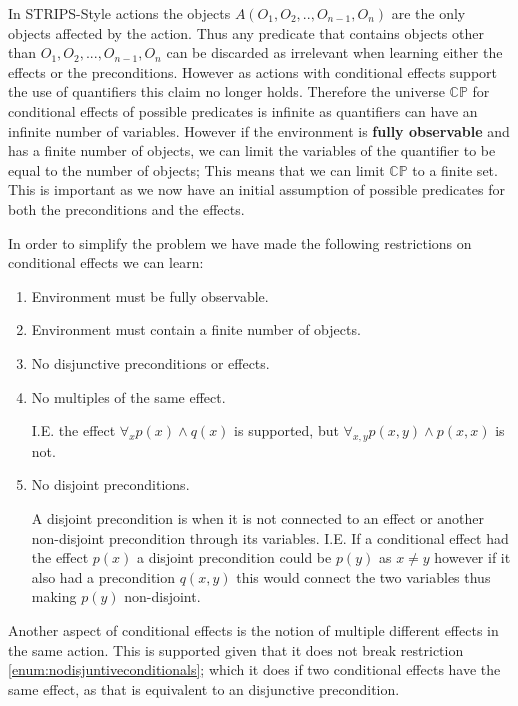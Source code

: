 \documentclass[../Master.tex]{subfiles}
\begin{document}
In STRIPS-Style actions the objects $A(O_1,O_2,..,O_{n-1},O_n)$ are the only objects affected by the action. 
Thus any predicate that contains objects other than $O_1,O_2,...,O_{n-1},O_n$ can be discarded as irrelevant when learning either the effects or the preconditions.
However as actions with conditional effects support the use of quantifiers this claim no longer holds. 
Therefore the universe $\mathbb{CP}$ for conditional effects of possible predicates is infinite as quantifiers can have an infinite number of variables.
However if the environment is \textbf{fully observable} and has a finite number of objects, 
we can limit the variables of the quantifier to be equal to the number of objects; This means that we can limit $\mathbb{CP}$ to a finite set.
This is important as we now have an initial assumption of possible predicates for both the preconditions and the effects. 

In order to simplify the problem we have made the following restrictions on conditional effects we can learn:
\begin{enumerate}
	\item Environment must be fully observable.
	\item Environment must contain a finite number of objects.
	\item \label{enum:nodisjuntiveconditionals} No disjunctive preconditions or effects.
	\item \label{enum:nomultipleeffect} No multiples of the same effect. 
	
		  I.E. the effect $\forall_x p(x) \land q(x)$ is supported, but $\forall_{x, y} p(x, y) \land p(x, x) $ is not.
		  
	\item No disjoint preconditions. 
	
		  A disjoint precondition is when it is not connected to an effect or another non-disjoint precondition through its variables.
		  I.E. If a conditional effect had the effect $p(x)$ a disjoint precondition could be $p(y)$ as $x \neq y$ however if it also had a precondition $q(x,y)$ this would connect the two variables thus making $p(y)$ non-disjoint.
\end{enumerate}

Another aspect of conditional effects is the notion of multiple different effects in the same action. This is supported given that it does not break restriction \ref{enum:nodisjuntiveconditionals}; which it does if two conditional effects have the same effect, as that is equivalent to an disjunctive precondition.
 
\end{document}

